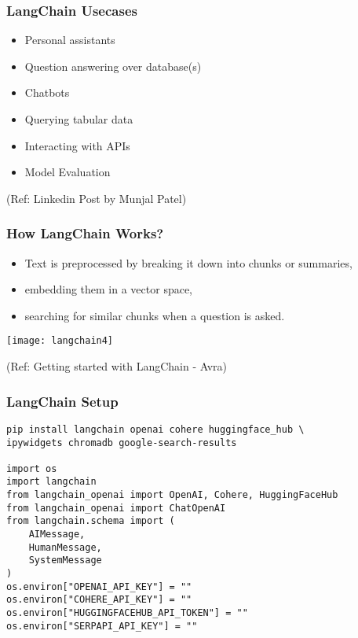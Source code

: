 \begin{frame}\frametitle{LangChain Usecases}

\begin{itemize}
\item Personal assistants
\item Question answering over database(s)
\item Chatbots
\item Querying tabular data
\item Interacting with APIs
\item Model Evaluation
\end{itemize}


{\tiny (Ref: Linkedin Post by Munjal Patel)}
\end{frame}


\begin{frame}\frametitle{How LangChain Works?}

\begin{itemize}
\item Text is preprocessed by breaking it down into chunks or summaries, 
\item embedding them in a vector space, 
\item searching for similar chunks when a question is asked. 
\end{itemize}

\begin{center}
\texttt{[image: langchain4]}
\end{center}	  


{\tiny (Ref: Getting started with LangChain - Avra)}
\end{frame}

\begin{frame}[fragile]\frametitle{LangChain Setup}

\begin{lstlisting}
pip install langchain openai cohere huggingface_hub \
ipywidgets chromadb google-search-results

import os
import langchain
from langchain_openai import OpenAI, Cohere, HuggingFaceHub
from langchain_openai import ChatOpenAI
from langchain.schema import (
    AIMessage,
    HumanMessage,
    SystemMessage
)
os.environ["OPENAI_API_KEY"] = ""
os.environ["COHERE_API_KEY"] = ""
os.environ["HUGGINGFACEHUB_API_TOKEN"] = ""
os.environ["SERPAPI_API_KEY"] = ""
\end{lstlisting}	  

\end{frame}

